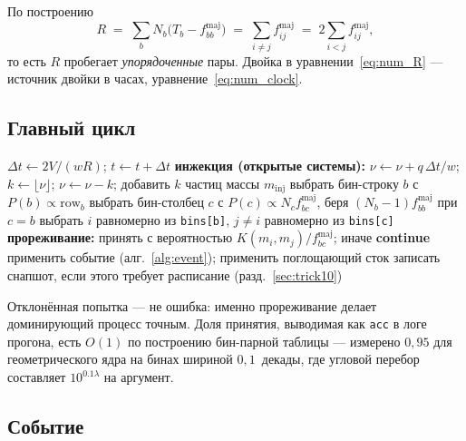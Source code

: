 \documentclass[a4paper,12pt]{article}
\newcommand{\minj}{m_{\mathrm{inj}}}
\newcommand{\fmaj}{f^{\mathrm{maj}}}
\newcommand{\code}[1]{\texttt{#1}}
\begin{document}
По построению
\begin{equation}
  R \;=\; \sum_b N_b\bigl(T_b - \fmaj_{bb}\bigr)
    \;=\; \sum_{i \neq j} \fmaj_{ij}
    \;=\; 2 \sum_{i<j} \fmaj_{ij},
  \label{eq:num_R}
\end{equation}
то есть $R$ пробегает \emph{упорядоченные} пары. Двойка в
уравнении~\eqref{eq:num_R} --- источник двойки в часах,
уравнение~\eqref{eq:num_clock}.

\subsection{Главный цикл}

\begin{algorithm}[h]
\caption{Главный цикл: одна мажорантная попытка}
\label{alg:mainloop}
\begin{algorithmic}[1]
  \State $\Delta t \gets 2V/(wR)$; \quad $t \gets t + \Delta t$
  \State \textbf{инжекция (открытые системы):}
         $\nu \gets \nu + q\,\Delta t / w$; \quad
         $k \gets \lfloor \nu \rfloor$; \quad $\nu \gets \nu - k$;
         добавить $k$ частиц массы $\minj$
  \State выбрать бин-строку $b$ с $P(b) \propto \text{row}_b$
  \State выбрать бин-столбец $c$ с
         $P(c) \propto N_c \fmaj_{bc}$, беря $(N_b-1)\fmaj_{bb}$ при $c=b$
  \State выбрать $i$ равномерно из \code{bins[b]}, $j \neq i$ равномерно из \code{bins[c]}
  \State \textbf{прореживание:} принять с вероятностью $K(m_i,m_j)/\fmaj_{bc}$;
         иначе \textbf{continue} 
  \State применить событие (алг.~\ref{alg:event}); применить поглощающий сток
  \State записать снапшот, если этого требует расписание (разд.~\ref{sec:trick10})
\EndWhile
\end{algorithmic}
\end{algorithm}

Отклонённая попытка --- не ошибка: именно прореживание делает доминирующий
процесс точным. Доля принятия, выводимая как \code{acc} в логе прогона,
есть $O(1)$ по построению бин-парной таблицы --- измерено $0{,}95$ для
геометрического ядра на бинах шириной $0{,}1$~декады, где угловой перебор
составляет $10^{0.1\lambda}$ на аргумент.

\subsection{Событие}
\end{document}
